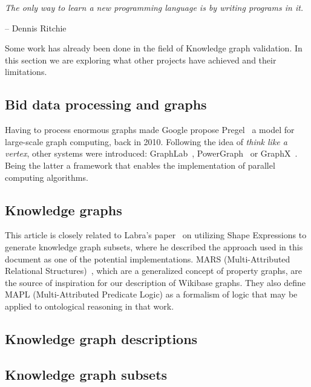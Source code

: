 \epigraph{\textit{The only way to learn a new programming language is by writing programs in it.}}{-- \textup{Dennis Ritchie}}

Some work has already been done in the field of Knowledge graph validation. In this section we are exploring what other projects have achieved and their limitations.

\subsection{Bid data processing and graphs}

Having to process enormous graphs made Google propose Pregel~\cite{10.1145/1807167.1807184} a model for large-scale graph computing, back in 2010. Following the idea of \textit{think like a vertex}, other systems were introduced: GraphLab~\cite{10.14778/2212351.2212354}, PowerGraph~\cite{180251} or GraphX~\cite{186216}. Being the latter a framework that enables the implementation of parallel computing algorithms.

\subsection{Knowledge graphs}

This article is closely related to Labra's paper~\cite{https://doi.org/10.48550/arxiv.2110.11709} on utilizing Shape Expressions to generate knowledge graph subsets, where he described the approach used in this document as one of the potential implementations. MARS (Multi-Attributed Relational Structures)~\cite{ijcai2017p165}, which are a generalized concept of property graphs, are the source of inspiration for our description of Wikibase graphs. They also define MAPL (Multi-Attributed Predicate Logic) as a formalism of logic that may be applied to ontological reasoning in that work.

\subsection{Knowledge graph descriptions}

\subsection{Knowledge graph subsets}
